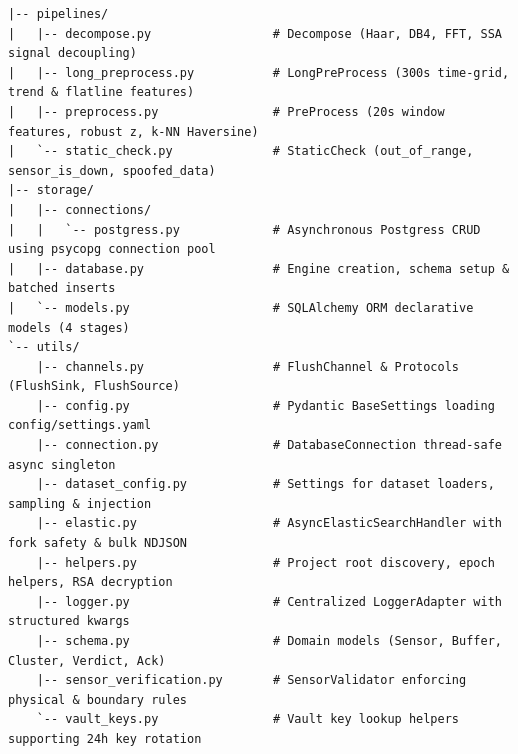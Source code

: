 \documentclass[10pt,a4paper]{report}
\begin{document}
\begin{lstlisting}
|-- pipelines/
|   |-- decompose.py                 # Decompose (Haar, DB4, FFT, SSA signal decoupling)
|   |-- long_preprocess.py           # LongPreProcess (300s time-grid, trend & flatline features)
|   |-- preprocess.py                # PreProcess (20s window features, robust z, k-NN Haversine)
|   `-- static_check.py              # StaticCheck (out_of_range, sensor_is_down, spoofed_data)
|-- storage/
|   |-- connections/
|   |   `-- postgress.py             # Asynchronous Postgress CRUD using psycopg connection pool
|   |-- database.py                  # Engine creation, schema setup & batched inserts
|   `-- models.py                    # SQLAlchemy ORM declarative models (4 stages)
`-- utils/
    |-- channels.py                  # FlushChannel & Protocols (FlushSink, FlushSource)
    |-- config.py                    # Pydantic BaseSettings loading config/settings.yaml
    |-- connection.py                # DatabaseConnection thread-safe async singleton
    |-- dataset_config.py            # Settings for dataset loaders, sampling & injection
    |-- elastic.py                   # AsyncElasticSearchHandler with fork safety & bulk NDJSON
    |-- helpers.py                   # Project root discovery, epoch helpers, RSA decryption
    |-- logger.py                    # Centralized LoggerAdapter with structured kwargs
    |-- schema.py                    # Domain models (Sensor, Buffer, Cluster, Verdict, Ack)
    |-- sensor_verification.py       # SensorValidator enforcing physical & boundary rules
    `-- vault_keys.py                # Vault key lookup helpers supporting 24h key rotation
\end{lstlisting}
\end{document}
